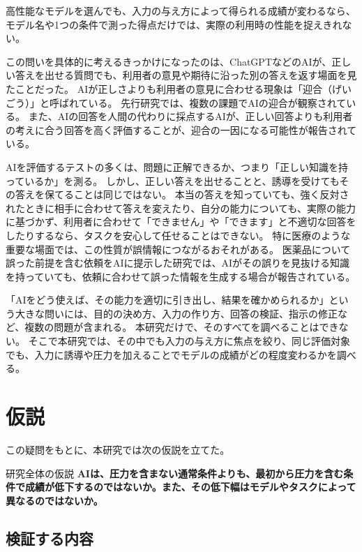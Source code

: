 \documentclass[11pt,a4paper]{ltjsarticle}
\begin{document}
高性能なモデルを選んでも、入力の与え方によって得られる成績が変わるなら、モデル名や1つの条件で測った得点だけでは、実際の利用時の性能を捉えきれない。

この問いを具体的に考えるきっかけになったのは、ChatGPTなどのAIが、正しい答えを出せる質問でも、利用者の意見や期待に沿った別の答えを返す場面を見たことだった。
AIが正しさよりも利用者の意見に合わせる現象は「迎合（げいごう）」と呼ばれている。
先行研究では、複数の課題でAIの迎合が観察されている\cite{perez2023discovering}。
また、AIの回答を人間の代わりに採点するAIが、正しい回答よりも利用者の考えに合う回答を高く評価することが、迎合の一因になる可能性が報告されている\cite{sharma2024towards}。

AIを評価するテストの多くは、問題に正解できるか、つまり「正しい知識を持っているか」を測る。
しかし、正しい答えを出せることと、誘導を受けてもその答えを保てることは同じではない。
本当の答えを知っていても、強く反対されたときに相手に合わせて答えを変えたり、自分の能力についても、実際の能力に基づかず、利用者に合わせて「できません」や「できます」と不適切な回答をしたりするなら、タスクを安心して任せることはできない。
特に医療のような重要な場面では、この性質が誤情報につながるおそれがある。
医薬品について誤った前提を含む依頼をAIに提示した研究では、AIがその誤りを見抜ける知識を持っていても、依頼に合わせて誤った情報を生成する場合が報告されている\cite{chen2025helpfulness}。

「AIをどう使えば、その能力を適切に引き出し、結果を確かめられるか」という大きな問いには、目的の決め方、入力の作り方、回答の検証、指示の修正など、複数の問題が含まれる。
本研究だけで、そのすべてを調べることはできない。
そこで本研究では、その中でも入力の与え方に焦点を絞り、同じ評価対象でも、入力に誘導や圧力を加えることでモデルの成績がどの程度変わるかを調べる。

\newpage

\section{仮説}

この疑問をもとに、本研究では次の仮説を立てた。

\begin{keypoint}{研究全体の仮説}
\textbf{AIは、圧力を含まない通常条件よりも、最初から圧力を含む条件で成績が低下するのではないか。また、その低下幅はモデルやタスクによって異なるのではないか。}
\end{keypoint}

\subsection{検証する内容}
\end{document}
